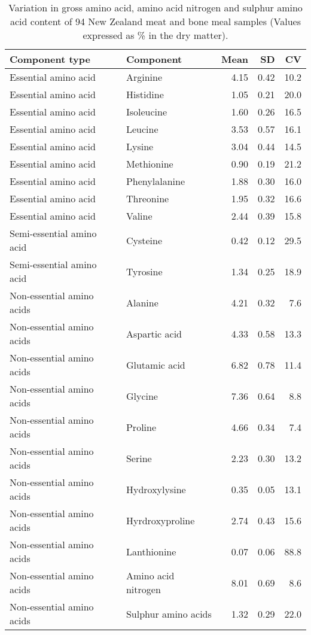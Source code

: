 \documentclass[
]{article}
\begin{document}
\begin{longtable}[t]{llrrr}
\caption{\label{tab:amino-acids-meat-bone-meal-sample}Variation in gross amino acid, amino acid nitrogen and sulphur amino acid content of 94 New Zealand meat and bone meal samples (Values expressed as \% in the dry matter).}\\
\toprule
Component type & Component & Mean & SD & CV\\
\midrule
Essential amino acid & Arginine & 4.15 & 0.42 & 10.2\\
Essential amino acid & Histidine & 1.05 & 0.21 & 20.0\\
Essential amino acid & Isoleucine & 1.60 & 0.26 & 16.5\\
Essential amino acid & Leucine & 3.53 & 0.57 & 16.1\\
Essential amino acid & Lysine & 3.04 & 0.44 & 14.5\\
\addlinespace
Essential amino acid & Methionine & 0.90 & 0.19 & 21.2\\
Essential amino acid & Phenylalanine & 1.88 & 0.30 & 16.0\\
Essential amino acid & Threonine & 1.95 & 0.32 & 16.6\\
Essential amino acid & Valine & 2.44 & 0.39 & 15.8\\
Semi-essential amino acid & Cysteine & 0.42 & 0.12 & 29.5\\
\addlinespace
Semi-essential amino acid & Tyrosine & 1.34 & 0.25 & 18.9\\
Non-essential amino acids & Alanine & 4.21 & 0.32 & 7.6\\
Non-essential amino acids & Aspartic acid & 4.33 & 0.58 & 13.3\\
Non-essential amino acids & Glutamic acid & 6.82 & 0.78 & 11.4\\
Non-essential amino acids & Glycine & 7.36 & 0.64 & 8.8\\
\addlinespace
Non-essential amino acids & Proline & 4.66 & 0.34 & 7.4\\
Non-essential amino acids & Serine & 2.23 & 0.30 & 13.2\\
Non-essential amino acids & Hydroxylysine & 0.35 & 0.05 & 13.1\\
Non-essential amino acids & Hyrdroxyproline & 2.74 & 0.43 & 15.6\\
Non-essential amino acids & Lanthionine & 0.07 & 0.06 & 88.8\\
\addlinespace
Non-essential amino acids & Amino acid nitrogen & 8.01 & 0.69 & 8.6\\
Non-essential amino acids & Sulphur amino acids & 1.32 & 0.29 & 22.0\\
\bottomrule
\end{longtable}
\end{document}
